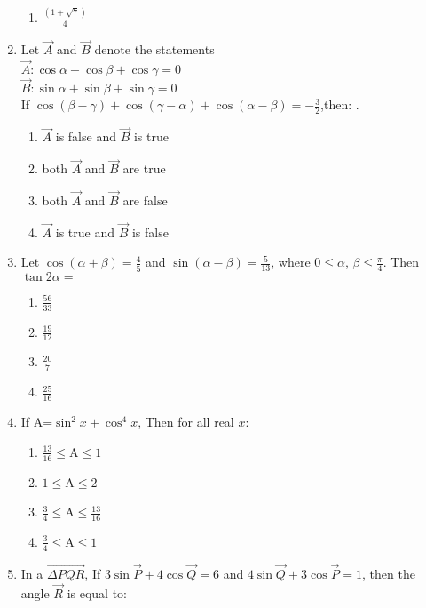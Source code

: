 \documentclass[journal,12pt,twocolumn]{IEEEtran}
\theoremstyle{remark}
\begin{document}
\begin{enumerate}
\begin{multicols}{2}
\begin{enumerate}
\item $\frac{(1+\sqrt{7})}{4}$
\end{enumerate} 
\end{multicols}
\item Let $\vec{A}$ and $\vec{B}$ denote the statements
\\ $\vec{A}:\cos\alpha+\cos\beta+\cos\gamma=0$
\\ $\vec{B}:\sin\alpha+\sin\beta+\sin\gamma=0$
\\If $\cos(\beta-\gamma)+\cos(\gamma-\alpha)+\cos(\alpha-\beta)=-\frac{3}{2}$,then:
.\hfill{}
\begin{enumerate}
\item $\vec{A}$ is false and $\vec{B}$ is true 
\item both $\vec{A}$ and $\vec{B}$ are true
\item both $\vec{A}$ and $\vec{B}$ are false 
\item $\vec{A}$ is true and $\vec{B}$ is false
\end{enumerate}
\item Let $\cos(\alpha+\beta)=\frac{4}{5}$  and $\sin(\alpha-\beta)=\frac{5}{13}$, where $0\le\alpha$, $\beta\le\frac{\pi}{4}$. Then $\tan2\alpha=$ \hfill{}
\begin{multicols}{4}
\begin{enumerate}
\item $\frac{56}{33}$
\columnbreak
\item $\frac{19}{12}$
\columnbreak
\item $\frac{20}{7}$
\columnbreak
\item $\frac{25}{16}$
\end{enumerate} 
\end{multicols}
\item If A=$\sin^2x +\cos^4 x$, Then for all real $x$:
\hfill{}
\begin{multicols}{2} 
\begin{enumerate}
\item $\frac{13}{16}\le$A$\le1$
\item $1\le$A$\le2$
\columnbreak
\item $\frac{3}{4}\le$A$\le\frac{13}{16}$
\item $\frac{3}{4}\le$A$\le1$
\end{enumerate} 
\end{multicols}
\item In a $\vec{\Delta PQR}$, If $3 \sin \vec{P} + 4 \cos \vec{Q}=6$ and $4\sin \vec{Q}+3\cos \vec{P}=1$, then the angle $\vec{R}$ is equal to:

\end{enumerate}
\end{document}
